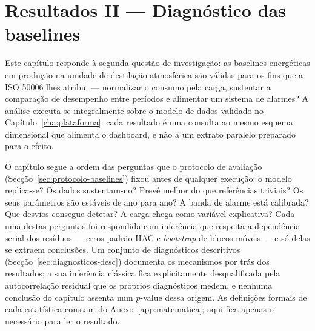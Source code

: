 
\chapter{Resultados II --- Diagnóstico das baselines}
\label{cha:diagnostico}

Este capítulo responde à segunda questão de investigação: as baselines
energéticas em produção na unidade de destilação atmosférica são válidas para
os fins que a ISO 50006 lhes atribui --- normalizar o consumo pela carga,
sustentar a comparação de desempenho entre períodos e alimentar um sistema de
alarmes? A análise executa-se integralmente sobre o modelo de dados
validado no Capítulo~\ref{cha:plataforma}: cada resultado é uma consulta ao
mesmo esquema dimensional que alimenta o dashboard, e não a um extrato
paralelo preparado para o efeito.

O capítulo segue a ordem das perguntas que o protocolo de avaliação
(Secção~\ref{sec:protocolo-baselines}) fixou antes de qualquer execução:
o modelo replica-se? Os dados sustentam-no? Prevê melhor do que referências
triviais? Os seus parâmetros são estáveis de ano para ano? A banda de alarme
está calibrada? Que desvios consegue detetar? A carga chega como variável
explicativa? Cada uma destas perguntas foi respondida com inferência que
respeita a dependência serial dos resíduos --- erros-padrão HAC e
\emph{bootstrap} de blocos móveis --- e só delas se extraem conclusões. Um
conjunto de diagnósticos descritivos (Secção~\ref{sec:diagnosticos-desc})
documenta os mecanismos por trás dos resultados; a sua inferência clássica
fica explicitamente desqualificada pela autocorrelação residual que os
próprios diagnósticos medem, e nenhuma conclusão do capítulo assenta num
$p$-value dessa origem. As definições formais de cada estatística constam do
Anexo~\ref{app:matematica}; aqui fica apenas o necessário para ler o
resultado.

